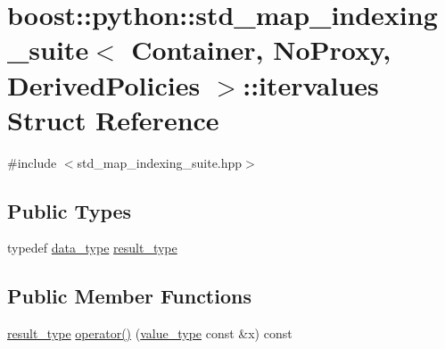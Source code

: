 \hypertarget{structboost_1_1python_1_1std__map__indexing__suite_1_1itervalues}{\section{boost\-:\-:python\-:\-:std\-\_\-map\-\_\-indexing\-\_\-suite$<$ Container, No\-Proxy, Derived\-Policies $>$\-:\-:itervalues Struct Reference}
\label{structboost_1_1python_1_1std__map__indexing__suite_1_1itervalues}
}


{\ttfamily \#include $<$std\-\_\-map\-\_\-indexing\-\_\-suite.\-hpp$>$}

\subsection*{Public Types}
\begin{DoxyCompactItemize}
\item 
typedef \hyperlink{classboost_1_1python_1_1std__map__indexing__suite_a3e9a6a8b8ba34759cf0ba99fe5966041}{data\-\_\-type} \hyperlink{structboost_1_1python_1_1std__map__indexing__suite_1_1itervalues_a7d2f8df7d18009f2bad1363db4f718f3}{result\-\_\-type}
\end{DoxyCompactItemize}
\subsection*{Public Member Functions}
\begin{DoxyCompactItemize}
\item 
\hyperlink{structboost_1_1python_1_1std__map__indexing__suite_1_1itervalues_a7d2f8df7d18009f2bad1363db4f718f3}{result\-\_\-type} \hyperlink{structboost_1_1python_1_1std__map__indexing__suite_1_1itervalues_a36486ce19f8e08900aabe582d0502dc8}{operator()} (\hyperlink{classboost_1_1python_1_1std__map__indexing__suite_aff9ed68cf30e805a04a313d92c62ab38}{value\-\_\-type} const \&x) const 
\end{DoxyCompactItemize}


